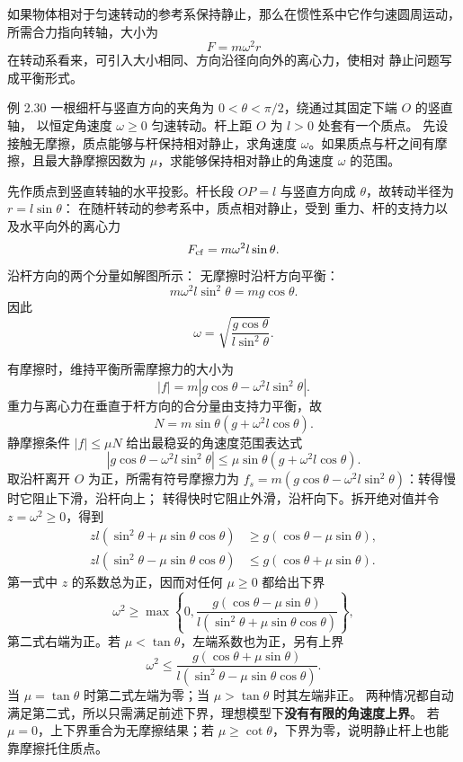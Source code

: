 如果物体相对于匀速转动的参考系保持静止，那么在惯性系中它作匀速圆周运动，所需合力指向转轴，大小为
\begin{equation}
 F=m\omega^2r \tag{2.13}
\end{equation}
在转动系看来，可引入大小相同、方向沿径向向外的离心力，使相对
静止问题写成平衡形式。

\begin{origexamplebox}{例 2.30}
一根细杆与竖直方向的夹角为 $0<\theta<\pi/2$，绕通过其固定下端 $O$ 的竖直轴，
以恒定角速度 $\omega\ge0$ 匀速转动。杆上距 $O$ 为 $l>0$ 处套有一个质点。
先设接触无摩擦，质点能够与杆保持相对静止，求角速度
$\omega$。如果质点与杆之间有摩擦，且最大静摩擦因数为 $\mu$，求能够保持相对静止的角速度
$\omega$ 的范围。
\probdiagTwoThirty
\end{origexamplebox}

\begin{xesolution}
先作质点到竖直转轴的水平投影。杆长段 $OP=l$ 与竖直方向成 $\theta$，故转动半径为 $r=l\sin\theta$：
\soldiagTwoThirtyGeometry
在随杆转动的参考系中，质点相对静止，受到
重力、杆的支持力以及水平向外的离心力
\[
 F_{\rm cf}=m\omega^2l\sin\theta.
\]
沿杆方向的两个分量如解图所示：
\soldiagTwoThirty
无摩擦时沿杆方向平衡：
\[
 m\omega^2l\sin^2\theta=mg\cos\theta.
\]
因此
\[
 \boxed{\omega=\sqrt{\frac{g\cos\theta}{l\sin^2\theta}}}.
\]

有摩擦时，维持平衡所需摩擦力的大小为
\[
 |f|=m\left|g\cos\theta-\omega^2l\sin^2\theta\right|.
\]
重力与离心力在垂直于杆方向的合分量由支持力平衡，故
\[
 N=m\sin\theta\left(g+\omega^2l\cos\theta\right).
\]
静摩擦条件 $|f|\le\mu N$ 给出最稳妥的角速度范围表达式
\[
 \boxed{
 \left|g\cos\theta-\omega^2l\sin^2\theta\right|
 \le\mu\sin\theta\left(g+\omega^2l\cos\theta\right)}.
\]
取沿杆离开 $O$ 为正，所需有符号摩擦力为
$f_s=m(g\cos\theta-\omega^2l\sin^2\theta)$：转得慢时它阻止下滑，沿杆向上；
转得快时它阻止外滑，沿杆向下。拆开绝对值并令 $z=\omega^2\ge0$，得到
\begin{align*}
 zl(\sin^2\theta+\mu\sin\theta\cos\theta)&\ge g(\cos\theta-\mu\sin\theta),\\
 zl(\sin^2\theta-\mu\sin\theta\cos\theta)&\le g(\cos\theta+\mu\sin\theta).
\end{align*}
第一式中 $z$ 的系数总为正，因而对任何 $\mu\ge0$ 都给出下界
\[
 \boxed{\omega^2\ge
 \max\!\left\{0,
 \frac{g(\cos\theta-\mu\sin\theta)}
 {l(\sin^2\theta+\mu\sin\theta\cos\theta)}\right\}},
\]
第二式右端为正。若 $\mu<\tan\theta$，左端系数也为正，另有上界
\[
 \boxed{\omega^2\le
 \frac{g(\cos\theta+\mu\sin\theta)}
 {l(\sin^2\theta-\mu\sin\theta\cos\theta)}}.
\]
当 $\mu=\tan\theta$ 时第二式左端为零；当 $\mu>\tan\theta$ 时其左端非正。
两种情况都自动满足第二式，所以只需满足前述下界，理想模型下\textbf{没有有限的角速度上界}。
若 $\mu=0$，上下界重合为无摩擦结果；若 $\mu\ge\cot\theta$，下界为零，说明静止杆上也能靠摩擦托住质点。
\end{xesolution}

